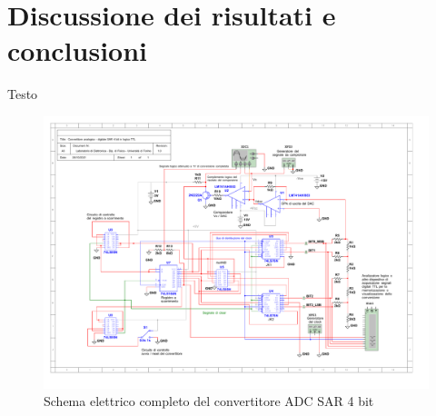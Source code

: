 \documentclass[journal]{IEEEtran}
\begin{document}
\section{Discussione dei risultati e conclusioni}
Testo


\begin{figure}[t]%
\centering
\begin{center}
\includegraphics[trim = {0 0 50 0}, width=1.40\textwidth, angle=90]{sch-simulations/digital/output/Schema_convertitore_completo.pdf}
\end{center}
\caption{Schema elettrico completo del convertitore ADC SAR 4 bit}
\label{fig:circuit_sarCompleteSchematic}
\end{figure}




\clearpage
\end{document}
